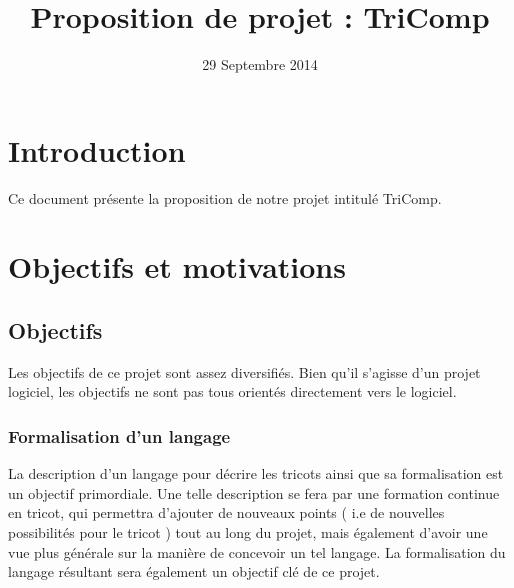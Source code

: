 \documentclass{article}
\title{Proposition de projet : TriComp}
\author{}
\date{29 Septembre 2014}
\begin{document}
\maketitle
\pagebreak

%


\section{Introduction}

Ce document présente la proposition de notre projet intitulé TriComp.

\section{Objectifs et motivations}

\subsection{Objectifs}

Les objectifs de ce projet sont assez diversifiés. 
Bien qu'il s'agisse d'un projet logiciel, les objectifs ne sont pas tous orientés directement vers le logiciel.

\subsubsection{Formalisation d'un langage}

La description d'un langage pour décrire les tricots ainsi que sa formalisation est un objectif primordiale.
Une telle description se fera par une formation continue en tricot, qui permettra d'ajouter de nouveaux points ( i.e de nouvelles
possibilités pour le tricot ) tout au long du projet, mais également d'avoir une vue plus générale sur la manière de concevoir un tel
langage. La formalisation du langage résultant sera également un objectif clé de ce projet.
\end{document}
